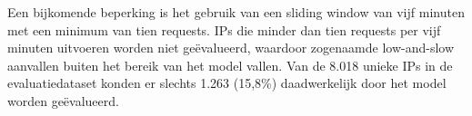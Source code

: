 Een bijkomende beperking is het gebruik van een sliding window van vijf minuten met een minimum van tien requests. IPs die minder dan tien requests per vijf minuten uitvoeren worden niet geëvalueerd, waardoor zogenaamde low-and-slow aanvallen buiten het bereik van het model vallen. Van de 8.018 unieke IPs in de evaluatiedataset konden er slechts 1.263 (15,8\%) daadwerkelijk door het model worden geëvalueerd.